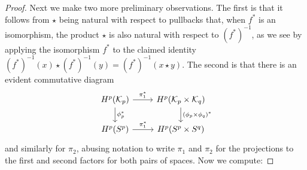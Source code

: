 \begin{proof}
	Next we make two more preliminary observations.
	The first is that it follows from $\star$ being natural with respect to pullbacks that, when $f^*$ is an isomorphism, the product $\star$ is also natural with respect to $(f^*)^{-1}$, as we see by applying the isomorphism $f^*$ to the claimed identity $(f^*)^{-1}(x)\star (f^*)^{-1}(y) = (f^*)^{-1}(x\star y)$.
	The second is that there is an evident commutative diagram
	\begin{equation}\label{D: projections}
		\begin{tikzcd}
			H^p(\mc K_p) \arrow{r}{\pi_1^*} \arrow[d, "\phi_p^*"] &
			H^p(\mc K_p \times \mc K_q) \arrow[d, "(\phi_p \times \phi_q)^*"] \\
			H^p(S^p) \arrow{r}{\pi_1^*} & H^p(S^p \times S^q)
		\end{tikzcd}
	\end{equation}
	and similarly for $\pi_2$, abusing notation to write $\pi_1$ and $\pi_2$ for the projections to the first and second factors for both pairs of spaces.
	Now we compute:

\end{proof}
